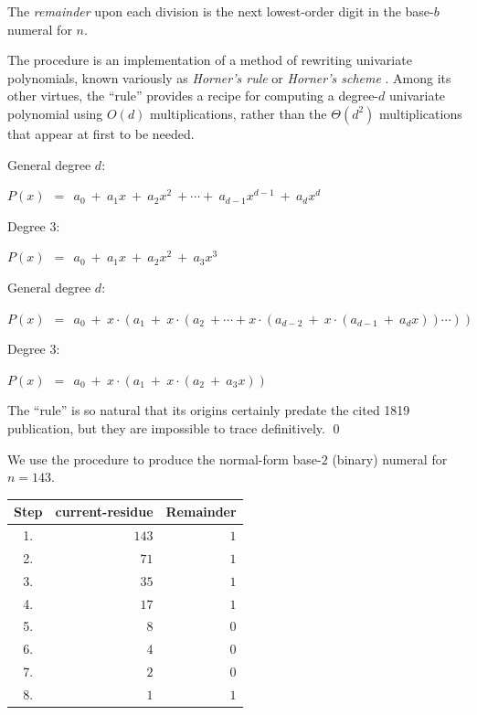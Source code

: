 \noindent
The {\em remainder} upon each division is the next lowest-order
digit in the base-$b$ numeral for $n$.


\bigskip

%
The procedure is an implementation of a method of rewriting univariate
polynomials, known variously as {\it Horner's rule} or {\it Horner's
  scheme} \cite{Horner}.  
 
Among its other virtues, the ``rule'' provides a recipe for computing
a degree-$d$ univariate polynomial using $O(d)$ multiplications,
rather than the $\Theta(d^2)$ multiplications that appear at first to
be needed.

\medskip


\noindent General degree $d$:

$P(x) \ \ = \ \ a_0 \ + \ a_1 x \ + \ a_2 x^2 \ + \cdots + \ a_{d-1}
x^{d-1} \ + \ a_d x^d$

\noindent Degree $3$:

$P(x) \ \ = \ \ a_0 \ + \ a_1 x \ + \ a_2 x^2 \ + \ a_3 x^3$

\medskip


\noindent General degree $d$:

$P(x) \ \ = \ \ a_0 \ + \ x \cdot (a_1 \ + \ x \cdot (a_2  \ +  \cdots
+ x \cdot (a_{d-2} \ + \ x \cdot (a_{d-1} \ + \ a_d x)) \cdots ))$  

\noindent Degree $3$:

$P(x) \ \ = \ \ a_0 \ + \ x \cdot (a_1 \ + \ x \cdot (a_2  \ + \ a_3 x))$ 

\medskip

The ``rule'' is so natural that its origins certainly predate the
cited 1819 publication, but they are impossible to trace definitively.  \qed 

\bigskip

We use the procedure to produce the normal-form base-$2$ (binary)
numeral for $n = 143$.

\medskip

\begin{tabular}{|c|r|r|}
\hline
Step &
{\sc current-residue} &
Remainder \\
\hline
1. & $143$ & $1$ \\
2. & $71$  & $1$ \\
3. & $35$  & $1$ \\
4. & $17$  & $1$ \\
5. & $8$   & $0$ \\
6. & $4$   & $0$ \\
7. & $2$   & $0$ \\
8. & $1$   & $1$ \\
\hline
\end{tabular}


